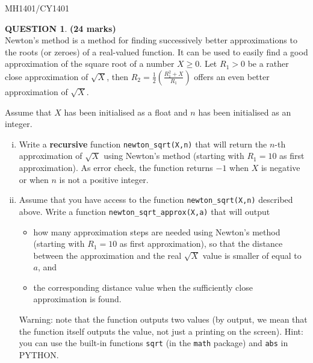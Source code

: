 \documentclass[a4paper,12pt]{article}
\theoremstyle{definition}
\newtheorem{ques}[dummy]{QUESTION}
\theoremstyle{plain}
\newcommand{\ttx}[1]{\texttt{#1}}
\newcommand{\bigbracket}[1]{\left( #1 \right)}
\begin{document}
\newpage

\hfill MH1401/CY1401\vspace*{0.5em}

\begin{ques}\hfill \textbf{(24 marks)}\vspace*{2em}\\
	Newton's method is a method for finding successively better approximations to the roots (or zeroes) of a real-valued function. It can be used to easily find a good approximation of the square root of a number $X\geq 0$. Let $R_1 > 0$ be a rather close approximation of $\sqrt{X}$, then $R_2 = \frac{1}{2}\bigbracket{\frac{R_1^2+X}{R_1}}$ offers an even better approximation of $\sqrt{X}$.\vspace*{1em}
	
	Assume that $X$ has been initialised as a float and $n$ has been initialised as an integer.
	
	\begin{enumerate}[(i)]
		\item Write a \textbf{recursive} function \ttx{newton\_sqrt(X,n)} that will return the $n$-th approximation of $\sqrt{X}$ using Newton's method (starting with $R_1 = 10$ as first approximation). As error check, the function returns $-1$ when $X$ is negative or when $n$ is not a positive integer.
		
		\item Assume that you have access to the function \ttx{newton\_sqrt(X,n)} described above. Write a function \ttx{newton\_sqrt\_approx(X,a)} that will output
		\begin{itemize}
			\item how many approximation steps are needed using Newton's method (starting with $R_1 = 10$ as first approximation), so that the distance between the approximation and the real $\sqrt{X}$ value is smaller of equal to $a$, and
			\item the corresponding distance value when the sufficiently close approximation is found.
		\end{itemize}
		Warning: note that the function outputs two values (by output, we mean that the function itself outputs the value, not just a printing on the screen). Hint: you can use the built-in functions \ttx{sqrt} (in the \texttt{math} package) and \ttx{abs} in PYTHON.
	\end{enumerate}
\end{ques}
\end{document}
